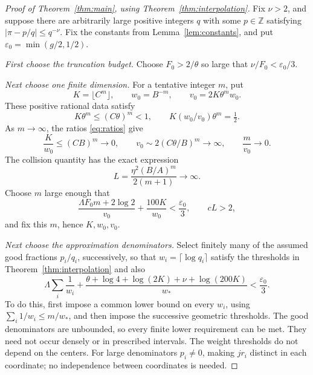 \documentclass[11pt]{article}
\theoremstyle{definition}
\theoremstyle{remark}
\newcommand{\Z}{\mathbb Z}
\numberwithin{equation}{section}
\begin{document}
\begin{proof}[Proof of Theorem~\ref{thm:main}, using Theorem~\ref{thm:interpolation}]
Fix \(\nu>2\), and suppose there are arbitrarily large positive
integers \(q\) with some \(p\in\Z\) satisfying
\(|\pi-p/q|\le q^{-\nu}\). Fix the constants from
Lemma~\ref{lem:constants}, and put \(\varepsilon_0=\min(g/2,1/2)\).

\emph{First choose the truncation budget.} Choose \(F_0>2/\theta\)
so large that \(\nu/F_0<\varepsilon_0/3\).

\emph{Next choose one finite dimension.} For a tentative integer \(m\),
put
\begin{equation}\label{eq:dimension}
 K=\lfloor C^m\rfloor,\qquad w_0=B^{-m},\qquad
 v_0=2K\theta^m w_0.
\end{equation}
These positive rational data satisfy
\[
 K\theta^m\le(C\theta)^m<1,\qquad
 K(w_0/v_0)\theta^m=\tfrac12.
\]
As \(m\to\infty\), the ratios \eqref{eq:ratios} give
\[
 \frac K{w_0}\le(CB)^m\to0,\qquad
 v_0\sim2(C\theta/B)^m\to\infty,\qquad \frac m{v_0}\to0.
\]
The collision quantity has the exact expression
\begin{equation}\label{eq:collisiongrowth}
 L=\frac{\eta^2(B/A)^m}{2(m+1)}\longrightarrow\infty.
\end{equation}
Choose \(m\) large enough that
\begin{equation}\label{eq:dimensionmargin}
 \frac{\Lambda F_0m+2\log2}{v_0}+\frac{100K}{w_0}
 <\frac{\varepsilon_0}{3},\qquad cL>2,
\end{equation}
and fix this \(m\), hence \(K,w_0,v_0\).

\emph{Next choose the approximation denominators.} Select finitely
many of the assumed good fractions \(p_i/q_i\), successively, so that
\(w_i=\lceil\log q_i\rceil\) satisfy the thresholds in
Theorem~\ref{thm:interpolation} and also
\begin{equation}\label{eq:weightmargin}
 \Lambda\sum_i\frac1{w_i}
 +\frac{\theta+\log4+\log(2K)+\nu+\log(200K)}{w_*}
 <\frac{\varepsilon_0}{3}.
\end{equation}
To do this, first impose a common lower bound on every \(w_i\), using
\(\sum_i1/w_i\le m/w_*\), and then impose the successive geometric
thresholds. The good denominators are unbounded, so every finite lower
requirement can be met. They need not occur densely or in prescribed
intervals. The weight thresholds do not depend on the centers.
For large denominators \(p_i\ne0\), making \(jr_i\) distinct in
each coordinate; no independence between coordinates is needed.


\end{proof}
\end{document}
